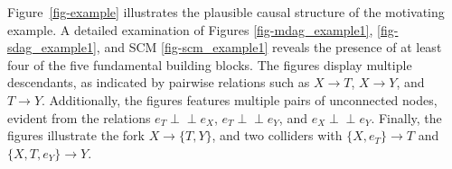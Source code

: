 \documentclass[
  authoryear,
  preprint,
  1p]{elsarticle}
\begin{document}
Figure~\ref{fig-example} illustrates the plausible causal structure of
the motivating example. A detailed examination of Figures
\ref{fig-mdag_example1}, \ref{fig-sdag_example1}, and SCM
\ref{fig-scm_example1} reveals the presence of at least four of the five
fundamental building blocks. The figures display multiple descendants,
as indicated by pairwise relations such as \(X \rightarrow T\),
\(X \rightarrow Y\), and \(T \rightarrow Y\). Additionally, the figures
features multiple pairs of unconnected nodes, evident from the relations
\(e_{T} \perp\!\!\!\perp e_{X}\), \(e_{T} \perp\!\!\!\perp e_{Y}\), and
\(e_{X} \perp\!\!\!\perp e_{Y}\). Finally, the figures illustrate the
fork \(X \rightarrow \{T,Y\}\), and two colliders with
\(\{X,e_{T}\} \rightarrow T\) and \(\{X,T,e_{Y}\} \rightarrow Y\).

\begin{figure}

\begin{minipage}{0.33\linewidth}



\end{minipage}%
%
\begin{minipage}{0.33\linewidth}



\end{minipage}
\end{figure}
\end{document}
